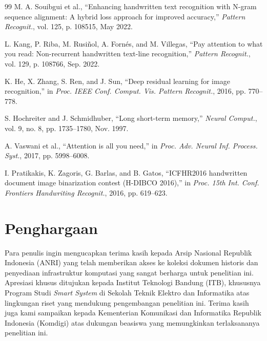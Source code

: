 \documentclass[journal]{IEEEtran}
\begin{document}
\begin{thebibliography}{99}
M. A. Souibgui et al., ``Enhancing handwritten text recognition with N-gram sequence alignment: A hybrid loss approach for improved accuracy,'' \textit{Pattern Recognit.}, vol. 125, p. 108515, May 2022.

L. Kang, P. Riba, M. Rusiñol, A. Fornés, and M. Villegas, ``Pay attention to what you read: Non-recurrent handwritten text-line recognition,'' \textit{Pattern Recognit.}, vol. 129, p. 108766, Sep. 2022.

K. He, X. Zhang, S. Ren, and J. Sun, ``Deep residual learning for image recognition,'' in \textit{Proc. IEEE Conf. Comput. Vis. Pattern Recognit.}, 2016, pp. 770--778.

S. Hochreiter and J. Schmidhuber, ``Long short-term memory,'' \textit{Neural Comput.}, vol. 9, no. 8, pp. 1735--1780, Nov. 1997.

A. Vaswani et al., ``Attention is all you need,'' in \textit{Proc. Adv. Neural Inf. Process. Syst.}, 2017, pp. 5998--6008.

I. Pratikakis, K. Zagoris, G. Barlas, and B. Gatos, ``ICFHR2016 handwritten document image binarization contest (H-DIBCO 2016),'' in \textit{Proc. 15th Int. Conf. Frontiers Handwriting Recognit.}, 2016, pp. 619--623.

\end{thebibliography}

\section*{Penghargaan}

Para penulis ingin mengucapkan terima kasih kepada Arsip Nasional Republik Indonesia (ANRI) yang telah memberikan akses ke koleksi dokumen historis dan  penyediaan infrastruktur komputasi  yang sangat berharga untuk penelitian ini. Apresiasi khusus ditujukan kepada Institut Teknologi Bandung (ITB), khususnya Program Studi \textit{Smart System} di Sekolah Teknik Elektro dan Informatika atas lingkungan riset yang mendukung pengembangan penelitian ini. Terima kasih juga kami sampaikan kepada Kementerian Komunikasi dan Informatika Republik Indonesia (Komdigi) atas dukungan beasiswa yang memungkinkan terlaksananya penelitian ini.

\end{document}
